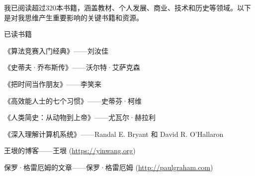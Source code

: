 

\begin{cvparagraph}
  我已阅读超过320本书籍，涵盖教材、个人发展、商业、技术和历史等领域。以下是对我思维产生重要影响的关键书籍和资源。
\end{cvparagraph}


\begin{cventries}

  \cventry
    {已读书籍} %
    {} %
    {} %
    {} %
    {
      \begin{cvitems}
        \item 《算法竞赛入门经典》——刘汝佳
        \item 《史蒂夫·乔布斯传》——沃尔特·艾萨克森
        \item 《把时间当作朋友》——李笑来
        \item 《高效能人士的七个习惯》——史蒂芬·柯维
        \item 《人类简史：从动物到上帝》——尤瓦尔·赫拉利
        \item 《深入理解计算机系统》——Randal E. Bryant 和 David R. O'Hallaron
        \item 王垠的博客——王垠 (\url{https://yinwang.org})
        \item 保罗·格雷厄姆的文章——保罗·格雷厄姆 (\url{http://paulgraham.com})
      \end{cvitems}
    }


\end{cventries}
